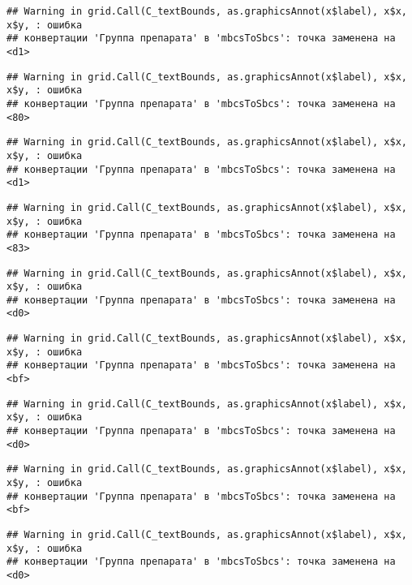 \documentclass[
]{article}
\begin{document}
\begin{verbatim}
## Warning in grid.Call(C_textBounds, as.graphicsAnnot(x$label), x$x, x$y, : ошибка
## конвертации 'Группа препарата' в 'mbcsToSbcs': точка заменена на <d1>
\end{verbatim}

\begin{verbatim}
## Warning in grid.Call(C_textBounds, as.graphicsAnnot(x$label), x$x, x$y, : ошибка
## конвертации 'Группа препарата' в 'mbcsToSbcs': точка заменена на <80>
\end{verbatim}

\begin{verbatim}
## Warning in grid.Call(C_textBounds, as.graphicsAnnot(x$label), x$x, x$y, : ошибка
## конвертации 'Группа препарата' в 'mbcsToSbcs': точка заменена на <d1>
\end{verbatim}

\begin{verbatim}
## Warning in grid.Call(C_textBounds, as.graphicsAnnot(x$label), x$x, x$y, : ошибка
## конвертации 'Группа препарата' в 'mbcsToSbcs': точка заменена на <83>
\end{verbatim}

\begin{verbatim}
## Warning in grid.Call(C_textBounds, as.graphicsAnnot(x$label), x$x, x$y, : ошибка
## конвертации 'Группа препарата' в 'mbcsToSbcs': точка заменена на <d0>
\end{verbatim}

\begin{verbatim}
## Warning in grid.Call(C_textBounds, as.graphicsAnnot(x$label), x$x, x$y, : ошибка
## конвертации 'Группа препарата' в 'mbcsToSbcs': точка заменена на <bf>
\end{verbatim}

\begin{verbatim}
## Warning in grid.Call(C_textBounds, as.graphicsAnnot(x$label), x$x, x$y, : ошибка
## конвертации 'Группа препарата' в 'mbcsToSbcs': точка заменена на <d0>
\end{verbatim}

\begin{verbatim}
## Warning in grid.Call(C_textBounds, as.graphicsAnnot(x$label), x$x, x$y, : ошибка
## конвертации 'Группа препарата' в 'mbcsToSbcs': точка заменена на <bf>
\end{verbatim}

\begin{verbatim}
## Warning in grid.Call(C_textBounds, as.graphicsAnnot(x$label), x$x, x$y, : ошибка
## конвертации 'Группа препарата' в 'mbcsToSbcs': точка заменена на <d0>
\end{verbatim}
\end{document}
